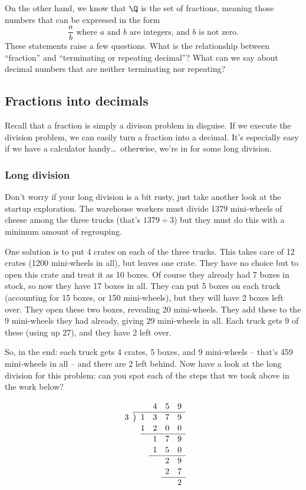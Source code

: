 On the other hand, we know that $\Q$ is the set of fractions, meaning those numbers that can be expressed in the form \[\frac{a}{b} \text{ where $a$ and $b$ are integers, and $b$ is not zero.}\]
These statements raise a few questions. What is the relationship between ``fraction'' and ``terminating or repeating decimal''? What can we say about decimal numbers that are neither terminating nor repeating?

\subsection{Fractions into decimals}

Recall that a fraction is simply a divison problem in disguise. If we execute the division problem, we can easily turn a fraction into a decimal. It's especially easy if we have a calculator handy\ldots\ otherwise, we're in for some long division.

\subsubsection{Long division}

Don't worry if your long division is a bit rusty, just take another look at the startup exploration. The warehouse workers must divide 1379 mini-wheels of cheese among the three trucks (that's $1379 \div 3$) but they must do this with a minimum amount of regrouping.

One solution is to put 4 crates on each of the three trucks. This takes care of 12 crates (1200 mini-wheels in all), but leaves one crate. They have no choice but to open this crate and treat it as 10 boxes. Of course they already had 7 boxes in stock, so now they have 17 boxes in all. They can put 5 boxes on each truck (accounting for 15 boxes, or 150 mini-wheels), but they will have 2 boxes left over. They open these two boxes, revealing 20 mini-wheels. They add these to the 9 mini-wheels they had already, giving 29 mini-wheels in all. Each truck gets 9 of these (using up 27), and they have 2 left over.

So, in the end: each truck gets 4 crates, 5 boxes, and 9 mini-wheels -- that's 459 mini-wheels in all -- and there are 2 left behind. Now have a look at the long division for this problem: can you spot each of the steps that we took above in the work below?

\[
\renewcommand\arraystretch{1.1}
\begin{array}{*1r @{\hskip\arraycolsep}c@{\hskip\arraycolsep} *4r}
	&&			& 4	& 5 & 9\\
\cline{2-6}
3	&\big)&	1	& 3	& 7 & 9\\
	&&		1	& 2	& 0	& 0\\
\cline{3-6}
	&&			& 1	& 7 & 9\\
	&&			& 1	& 5	& 0\\
\cline{4-6}
	&&			& 	& 2	& 9\\
	&&			&	& 2	& 7\\
\cline{5-6}
	&&			& 	& 	& 2\\
\end{array}
\]

